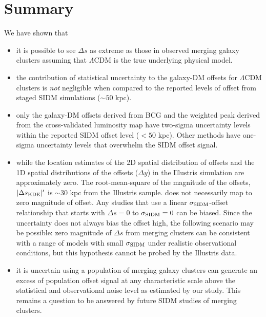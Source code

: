 \section{Summary}
We have shown that 
\begin{itemize}
		\item it is possible to  
			see $\Delta s$ as extreme as those in observed merging galaxy clusters assuming that
			$\Lambda$CDM is the true underlying physical model.  \\

		\item the contribution of statistical uncertainty to the galaxy-DM offsets 
			for $\Lambda$CDM clusters is {\it not} negligible when compared to the reported
			levels of offset from staged SIDM simulations ($\sim 50$ kpc).\\ 

		\item only the galaxy-DM offsets derived from BCG and the weighted peak
			derived from the cross-validated
			luminosity map have two-sigma uncertainty levels within the reported SIDM offset
			level ($< 50$ kpc). Other methods have one-sigma uncertainty levels that overwhelm the
			SIDM offset signal.\\ 

		\item while the location estimates of the 2D spatial distribution of offsets and the
			1D spatial distributions of the offsets ($\Delta y$) in the Illustris
			simulation are approximately zero.
			The root-mean-square of the magnitude of the
		offsets, $|\Delta s_{\rm KDE}|'$ is $\sim 30$ kpc from the Illustris sample. 
			does not necessarily map to zero magnitude of offset.  
			Any studies that use a linear $\sigma_{\rm SIDM}$-offset relationship
			that starts with $\Delta s = 0$ to $\sigma_{\rm SIDM} = 0$ can be biased. 
			Since the uncertainty does not always bias the offset high, 
		the following scenario may be possible: zero magnitude of
			$\Delta s$ from merging clusters 
			can be consistent with a range of models with small
			$\sigma_{\rm SIDM}$ under realistic observational conditions,
			but this hypothesis cannot be probed by the Illustris data.\\
  
	 \item it is uncertain using a population of merging galaxy clusters 
		 can generate an excess of population offset signal at any characteristic
		 scale above the statistical
		 and observational noise level as estimated by our study.   
		 This remains a question to be answered by future SIDM studies of merging
		 clusters. 
			\\


\end{itemize}
